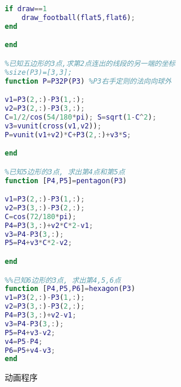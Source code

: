 \begin{lstlisting}[language=matlab, caption=body60.m]
%画图
if draw==1
    draw_football(flat5,flat6);
end

end

%已知五边形的3点,求第2点连出的线段的另一端的坐标
%size(P3)=[3,3];
function P=P32P(P3) %P3右手定则的法向向球外

v1=P3(2,:)-P3(1,:);
v2=P3(2,:)-P3(3,:);
C=1/2/cos(54/180*pi); S=sqrt(1-C^2);
v3=vunit(cross(v1,v2));
P=vunit(v1+v2)*C+P3(2,:)+v3*S;

end

%已知5边形的3点, 求出第4点和第5点
function [P4,P5]=pentagon(P3)

v1=P3(2,:)-P3(1,:); 
v2=P3(3,:)-P3(2,:);
C=cos(72/180*pi);
P4=P3(3,:)+v2*C*2-v1;
v3=P4-P3(3,:);
P5=P4+v3*C*2-v2;

end

%%已知6边形的3点, 求出第4,5,6点
function [P4,P5,P6]=hexagon(P3)
v1=P3(2,:)-P3(1,:); 
v2=P3(3,:)-P3(2,:);
P4=P3(3,:)+v2-v1;
v3=P4-P3(3,:);
P5=P4+v3-v2;
v4=P5-P4;
P6=P5+v4-v3;
end
\end{lstlisting}


动画程序

